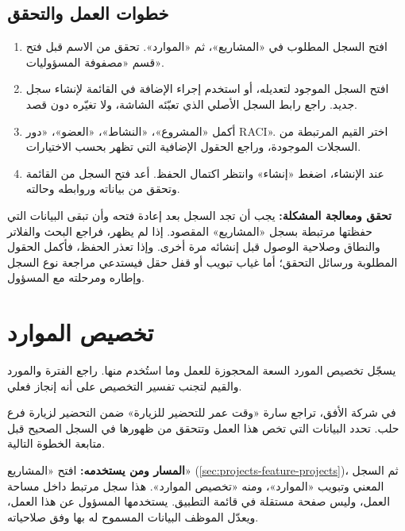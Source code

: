\subsection{خطوات العمل والتحقق}
\begin{enumerate}
\item افتح السجل المطلوب في «المشاريع»، ثم «الموارد». تحقق من الاسم قبل فتح قسم «مصفوفة المسؤوليات».
\item افتح السجل الموجود لتعديله، أو استخدم إجراء الإضافة في القائمة لإنشاء سجل جديد. راجع رابط السجل الأصلي الذي تعبّئه الشاشة، ولا تغيّره دون قصد.
\item أكمل «المشروع»، «النشاط»، «العضو»، «دور RACI». اختر القيم المرتبطة من السجلات الموجودة، وراجع الحقول الإضافية التي تظهر بحسب الاختيارات.
\item عند الإنشاء، اضغط «إنشاء» وانتظر اكتمال الحفظ. أعد فتح السجل من القائمة وتحقق من بياناته وروابطه وحالته.
\end{enumerate}

\textbf{تحقق ومعالجة المشكلة:} يجب أن تجد السجل بعد إعادة فتحه وأن تبقى البيانات التي حفظتها مرتبطة بسجل «المشاريع» المقصود. إذا لم يظهر، فراجع البحث والفلاتر والنطاق وصلاحية الوصول قبل إنشائه مرة أخرى. وإذا تعذر الحفظ، فأكمل الحقول المطلوبة ورسائل التحقق؛ أما غياب تبويب أو قفل حقل فيستدعي مراجعة نوع السجل وإطاره ومرحلته مع المسؤول.

\clearpage
\section{تخصيص الموارد}
\label{sec:projects-feature-resource-allocations}

يسجّل تخصيص المورد السعة المحجوزة للعمل وما استُخدم منها. راجع الفترة والمورد والقيم لتجنب تفسير التخصيص على أنه إنجاز فعلي.

\begin{rcnote}
في شركة الأفق، تراجع سارة «وقت عمر للتحضير للزيارة» ضمن التحضير لزيارة فرع حلب. تحدد البيانات التي تخص هذا العمل وتتحقق من ظهورها في السجل الصحيح قبل متابعة الخطوة التالية.
\end{rcnote}

\textbf{المسار ومن يستخدمه:} افتح «المشاريع» (\ref{sec:projects-feature-projects})، ثم السجل المعني وتبويب «الموارد»، ومنه «تخصيص الموارد». هذا سجل مرتبط داخل مساحة العمل، وليس صفحة مستقلة في قائمة التطبيق. يستخدمها المسؤول عن هذا العمل، ويعدّل الموظف البيانات المسموح له بها وفق صلاحياته.

